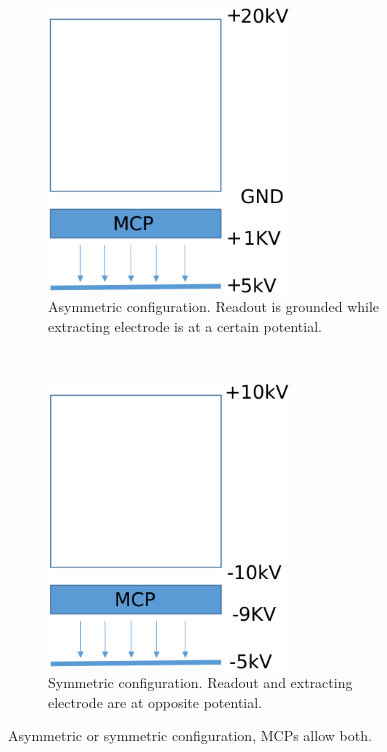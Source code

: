 \begin{figure}[!ht]
  \begin{subfigure}[t]{0.5\textwidth}
    \centering
    \includegraphics[width=0.7\textwidth]{04_IPHI_Test/figures/fig000_setup_hv_asym2}
    \caption{Asymmetric configuration.
    Readout is grounded while extracting electrode is at a certain potential.}
    \label{chap4:setup_hv_asym}
  \end{subfigure}
  ~
  \begin{subfigure}[t]{0.5\textwidth}
    \centering
    \includegraphics[width=0.7\textwidth]{04_IPHI_Test/figures/fig000_setup_hv_sym}
    \caption{Symmetric configuration. Readout and extracting electrode are at opposite potential.}
    \label{chap4:setup_hv_sym}
  \end{subfigure}
  \caption[Asymmetric or symmetric configuration]{Asymmetric or symmetric configuration, MCPs allow both.}
  \label{chap4:setup_hv}
\end{figure}
